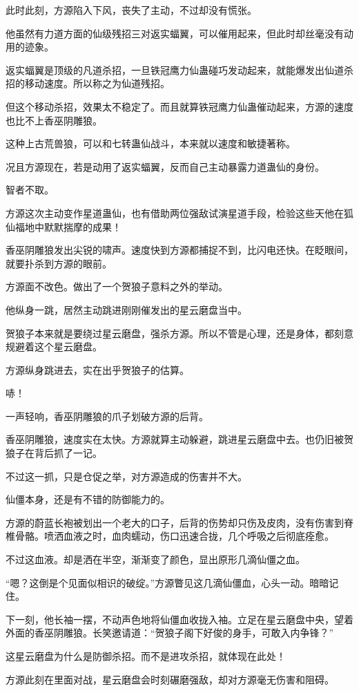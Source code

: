 \begin{this_body}
此时此刻，方源陷入下风，丧失了主动，不过却没有慌张。

他虽然有力道方面的仙级残招三对返实蝠翼，可以催用起来，但此时却丝毫没有动用的迹象。

返实蝠翼是顶级的凡道杀招，一旦铁冠鹰力仙蛊碰巧发动起来，就能爆发出仙道杀招的移动速度。所以称之为仙道残招。

但这个移动杀招，效果太不稳定了。而且就算铁冠鹰力仙蛊催动起来，方源的速度也比不上香巫阴雕狼。

这种上古荒兽狼，可以和七转蛊仙战斗，本来就以速度和敏捷著称。

况且方源现在，若是动用了返实蝠翼，反而自己主动暴露力道蛊仙的身份。

智者不取。

方源这次主动变作星道蛊仙，也有借助两位强敌试演星道手段，检验这些天他在狐仙福地中默默揣摩的成果！

香巫阴雕狼发出尖锐的啸声。速度快到方源都捕捉不到，比闪电还快。在眨眼间，就要扑杀到方源的眼前。

方源面不改色。做出了一个贺狼子意料之外的举动。

他纵身一跳，居然主动跳进刚刚催发出的星云磨盘当中。

贺狼子本来就是要绕过星云磨盘，强杀方源。所以不管是心理，还是身体，都刻意规避着这个星云磨盘。

方源纵身跳进去，实在出乎贺狼子的估算。

哧！

一声轻响，香巫阴雕狼的爪子划破方源的后背。

香巫阴雕狼，速度实在太快。方源就算主动躲避，跳进星云磨盘中去。也仍旧被贺狼子在背后抓了一记。

不过这一抓，只是仓促之举，对方源造成的伤害并不大。

仙僵本身，还是有不错的防御能力的。

方源的蔚蓝长袍被划出一个老大的口子，后背的伤势却只伤及皮肉，没有伤害到脊椎骨骼。喷洒血液之时，血肉蠕动，伤口迅速合拢，几个呼吸之后彻底痊愈。

不过这血液。却是洒在半空，渐渐变了颜色，显出原形几滴仙僵之血。

“嗯？这倒是个见面似相识的破绽。”方源瞥见这几滴仙僵血，心头一动。暗暗记住。

下一刻，他长袖一摆，不动声色地将仙僵血收拢入袖。立足在星云磨盘中央，望着外面的香巫阴雕狼。长笑邀请道：“贺狼子阁下好俊的身手，可敢入内争锋？”

这星云磨盘为什么是防御杀招。而不是进攻杀招，就体现在此处！

方源此刻在里面对战，星云磨盘会时刻碾磨强敌，却对方源毫无伤害和阻碍。


\end{this_body}
